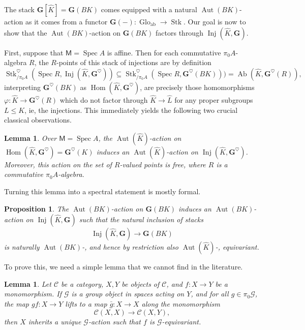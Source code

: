 \documentclass[11pt, a4paper]{article}
\newcommand{\ab}{\mathrm{ab}}
\DeclareMathOperator{\Spec}{Spec}
\newcommand{\1}{\mathbf{1}}
\DeclareMathOperator{\Ab}{Ab}
\DeclareMathOperator{\Glo}{Glo}
\DeclareMathOperator{\Inj}{Inj}
\DeclareMathOperator{\Stk}{Stk}
\DeclareMathOperator{\Aut}{Aut}
\DeclareMathOperator{\Hom}{Hom}
\newcommand{\dual}[1]{{\widehat{#1}}}
\newcommand{\calC}{\mathcal{C}}
\newcommand{\G}{\mathbf{G}}
\newcommand{\calG}{\mathcal{G}}
\newcommand{\M}{\mathsf{M}}
\theoremstyle{plain}
\newtheorem{prop}[equation]{Proposition}
\newtheorem{lemma}[equation]{Lemma}
\theoremstyle{definition}
\theoremstyle{remark}\numberwithin{equation}{section}
\begin{document}
The stack $\G[\dual{K}] = \G(BK)$ comes equipped with a natural $\Aut(BK)$-action as it comes from a functor $\G(-) \colon \Glo_\ab \to \Stk$. Our goal is now to show that the $\Aut(BK)$-action on $\G(BK)$ factors through $\Inj(\dual{K}, \G)$.

First, suppose that $\M = \Spec A$ is affine. Then for each commutative $\pi_0 A$-algebra $R$, the $R$-points of this stack of injections are by definition
\[%
{\Stk^\heartsuit_{/\pi_0A}}(\Spec R, \Inj(\dual{K}, \G^\heartsuit)) \subseteq {\Stk^\heartsuit_{/\pi_0A}}(\Spec R, \G^\heartsuit(BK))) = \Ab(\dual{K},\G^\heartsuit(R)),\]
interpreting $\G^\heartsuit(BK)$ as $\Hom(\dual{K}, \G^\heartsuit)$, are precisely those homomorphisms $\varphi \colon \dual{K} \to \G^\heartsuit(R)$ which do not factor through $\dual{K} \to \dual{L}$ for any proper subgroups $L\leq K$, ie, the injections. This immediately yields the following two crucial classical observations.

\begin{lemma}\label{lm:discrete_action_factors}
    Over $\M = \Spec A$, the $\Aut(\dual{K})$-action on $\Hom(\dual{K}, \G^\heartsuit) = \G^\heartsuit(K)$ induces an $\Aut(\dual{K})$-action on $\Inj(\dual{K}, \G^\heartsuit)$. Moreover, this action on the set of $R$-valued points is free, where $R$ is a commutative $\pi_0 A$-algebra.
\end{lemma}

Turning this lemma into a spectral statement is mostly formal.

\begin{prop}\label{pr:action_factors_to_inj}
    The $\Aut(BK)$-action on $\G(BK)$ induces an $\Aut(BK)$-action on $\Inj(\dual{K},\G)$ such that the natural inclusion of stacks
    \[\Inj(\dual{K},\G) \to \G(BK)\]
    is naturally $\Aut(BK)$-, and hence by restriction also $\Aut(\dual{K})$-, equivariant.
\end{prop}

To prove this, we need a simple lemma that we cannot find in the literature.

\begin{lemma}\label{lm:monmorphisms_and_actions}
    Let $\calC$ be a category, $X,Y$ be objects of $\calC$, and $f\colon X\to Y$ be a monomorphism. If $\calG$ is a group object in spaces acting on $Y$, and for all $g\in \pi_0 \calG$, the map $gf\colon X \to Y$ lifts to a map $\bar{g} \colon X \to X$ along the monomorphism
    \[{\calC}(X,X) \to {\calC}(X,Y),\]
    then $X$ inherits a unique $\calG$-action such that $f$ is $\calG$-equivariant.
\end{lemma}
\end{document}
